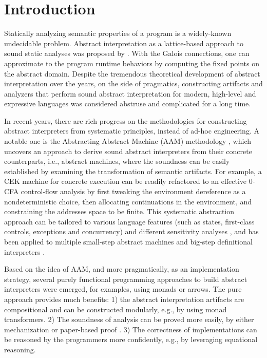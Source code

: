\section{Introduction} \label{intro}

Statically analyzing semantic properties of a program is a
widely-known undecidable problem. Abstract interpretation as a
lattice-based approach to sound static analyses was proposed
by \citet{DBLP:conf/popl/CousotC77}. With the Galois connections, one
can approximate to the program runtime behaviors by computing the
fixed points on the abstract domain. Despite the tremendous
theoretical development of abstract interpretation over the years, on
the side of pragmatics, constructing artifacts and analyzers that
perform sound abstract interpretation for modern, high-level and
expressive languages was considered abstruse and complicated for a
long time.

In recent years, there are rich progress on the methodologies for
constructing abstract interpreters from systematic principles, instead
of ad-hoc engineering. A notable one is the Abstracting Abstract
Machine (AAM) methodology \cite{DBLP:journals/jfp/HornM12,
  DBLP:conf/icfp/HornM10}, which uncovers an approach to derive sound
abstract interpreters from their concrete counterparts, i.e., abstract
machines, where the soundness can be easily established by examining
the transformation of semantic artifacts. For example, a CEK machine
\cite{DBLP:conf/popl/FelleisenF87} for concrete execution can be
readily refactored to an effective $0$-CFA control-flow analysis
\cite{Shivers:1988:CFA:53990.54007,
  Midtgaard:2012:CAF:2187671.2187672} by first tweaking the
environment dereference as a nondeterministic choice, then allocating
continuations in the environment, and constraining the addresses space
to be finite. This systematic abstraction approach can be tailored to
various language features (such as states, first-class controls,
exceptions and concurrency) and different sensitivity analyses
\cite{DBLP:conf/icfp/Gilray0M16, DBLP:conf/popl/GilrayL0MH16,
  Darais:2015:GTM:2814270.2814308}, and has been applied to multiple
small-step abstract machines \cite{DBLP:journals/jfp/HornM12,
  DBLP:conf/icfp/HornM10, Sergey:2013:MAI:2491956.2491979} and
big-step definitional interpreters \cite{Wei:2018:RAA:3243631.3236800,
  DBLP:journals/pacmpl/DaraisLNH17, Keidel:2018:CSP:3243631.3236767}.

Based on the idea of AAM, and more pragmatically, as an implementation
strategy, several purely functional programming approaches to build
abstract interpreters were emerged, for examples, using monads or
arrows. The pure approach provides much benefits: 1) the abstract
interpretation artifacts are compositional and can be constructed
modularly, e.g., by using monad transformers. 2) The soundness of
analysis can be proved more easily, by either mechanization
\cite{Darais:2016:CGC:2951913.2951934} or paper-based proof
\cite{Keidel:2018:CSP:3243631.3236767}.  3) The correctness of
implementations can be reasoned by the programmers more confidently,
e.g., by leveraging equational reasoning.

